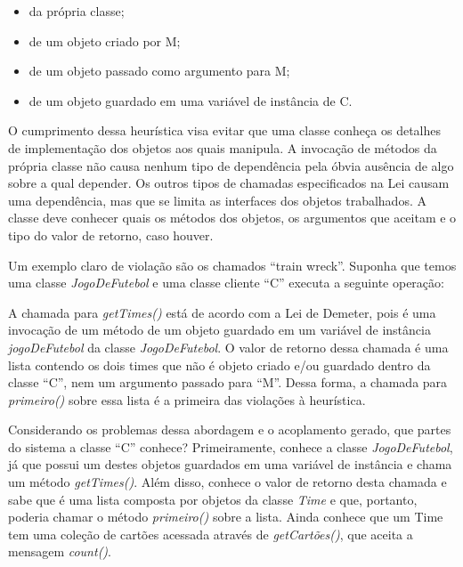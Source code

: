 \begin{itemize}
	\item da própria classe;
	\item de um objeto criado por M;
	\item de um objeto passado como argumento para M;
	\item de um objeto guardado em uma variável de instância de C.
\end{itemize}

O cumprimento dessa heurística visa evitar que uma classe conheça os detalhes de implementação dos objetos aos quais 
manipula. A invocação de métodos da própria classe não causa nenhum tipo de dependência pela óbvia ausência de algo 
sobre a qual depender. Os outros tipos de chamadas especificados na Lei causam uma dependência, mas que se limita as 
interfaces dos objetos trabalhados. A classe deve conhecer quais os métodos dos objetos, os argumentos que aceitam e o 
tipo do valor de retorno, caso houver.
	
Um exemplo claro de violação são os chamados ``train wreck''. Suponha que temos uma classe \textit{JogoDeFutebol} e uma classe 
cliente ``C'' executa a seguinte operação:
	


A chamada para \textit{getTimes()} está de acordo com a Lei de Demeter, pois é uma invocação de um método de um objeto guardado em um 
variável de instância \textit{jogoDeFutebol} da classe \textit{JogoDeFutebol}. O valor de retorno dessa chamada é uma lista contendo 
os dois times que não é objeto criado e/ou guardado dentro da classe ``C'', nem um argumento passado para ``M''. Dessa forma, a 
chamada para \textit{primeiro()} sobre essa lista é a primeira das violações à heurística.
	
Considerando os problemas dessa abordagem e o acoplamento gerado, que partes do sistema a classe ``C'' conhece? Primeiramente, 
conhece a classe \textit{JogoDeFutebol}, já que possui um destes objetos guardados em uma variável de instância e chama um método 
\textit{getTimes()}. Além disso, conhece o valor de retorno desta chamada e sabe que é uma lista composta por objetos da classe 
\textit{Time} e que, portanto, poderia chamar o método \textit{primeiro()} sobre a lista. Ainda conhece que um Time tem uma coleção 
de cartões acessada através de \textit{getCartões()}, que aceita a mensagem \textit{count()}.
	
